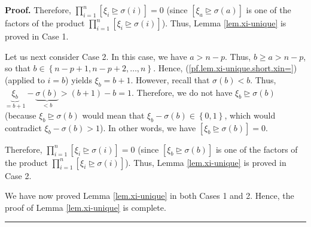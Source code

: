 \documentclass
[numbers=enddot,12pt,final,onecolumn,notitlepage,english]{scrartcl}%
\theoremstyle{definition}
\newenvironment{proof}[1][Proof]{\noindent\textbf{#1.} }{\ \rule{0.5em}{0.5em}}
\let\prodnonlimits\prod
\renewcommand{\prod}{\prodnonlimits\limits}
\newenvironment{vershort}{}{}
\begin{document}
\begin{vershort}
\begin{proof}
Therefore, $\prod_{i=1}^{n}\left[  \xi_{i}\trianglerighteq\sigma\left(
i\right)  \right]  =0$ (since $\left[  \xi_{a}\trianglerighteq\sigma\left(
a\right)  \right]  $ is one of the factors of the product $\prod_{i=1}%
^{n}\left[  \xi_{i}\trianglerighteq\sigma\left(  i\right)  \right]  $). Thus,
Lemma \ref{lem.xi-unique} is proved in Case 1.

Let us next consider Case 2. In this case, we have $a>n-p$. Thus, $b\geq
a>n-p$, so that $b\in\left\{  n-p+1,n-p+2,\ldots,n\right\}  $. Hence,
(\ref{pf.lem.xi-unique.short.xin=}) (applied to $i=b$) yields $\xi_{b}=b+1$.
However, recall that $\sigma\left(  b\right)  <b$. Thus, $\underbrace{\xi_{b}%
}_{=b+1}-\underbrace{\sigma\left(  b\right)  }_{<b}>\left(  b+1\right)  -b=1$.
Therefore, we do not have $\xi_{b}\trianglerighteq\sigma\left(  b\right)  $
(because $\xi_{b}\trianglerighteq\sigma\left(  b\right)  $ would mean that
$\xi_{b}-\sigma\left(  b\right)  \in\left\{  0,1\right\}  $, which would
contradict $\xi_{b}-\sigma\left(  b\right)  >1$). In other words, we have
$\left[  \xi_{b}\trianglerighteq\sigma\left(  b\right)  \right]  =0$.

Therefore, $\prod_{i=1}^{n}\left[  \xi_{i}\trianglerighteq\sigma\left(
i\right)  \right]  =0$ (since $\left[  \xi_{b}\trianglerighteq\sigma\left(
b\right)  \right]  $ is one of the factors of the product $\prod_{i=1}%
^{n}\left[  \xi_{i}\trianglerighteq\sigma\left(  i\right)  \right]  $). Thus,
Lemma \ref{lem.xi-unique} is proved in Case 2.

We have now proved Lemma \ref{lem.xi-unique} in both Cases 1 and 2. Hence, the
proof of Lemma \ref{lem.xi-unique} is complete.
\end{proof}
\end{vershort}
\end{document}
